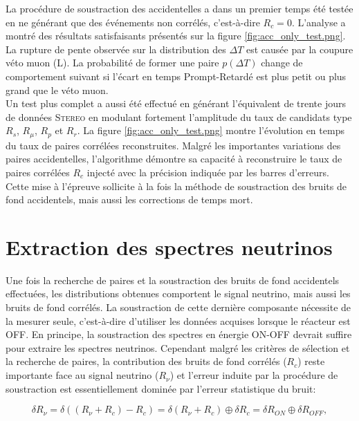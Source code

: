 La procédure de soustraction des accidentelles a dans un premier temps été testée en ne générant que des événements non corrélés, c'est-à-dire $R_c = 0$. L'analyse a montré des résultats satisfaisants présentés sur la figure \ref{fig:acc_only_test.png}. La rupture de pente observée sur la distribution des $\Delta T$ est causée par la coupure véto muon (L). La probabilité de former une paire $p(\Delta T)$ change de comportement suivant si l'écart en temps Prompt-Retardé est plus petit ou plus grand que le véto muon.\\

Un test plus complet a aussi été effectué en générant l'équivalent de trente jours de données \textsc{Stereo} en modulant fortement l'amplitude du taux de candidats type $R_s$, $R_\mu$, $R_p$ et $R_r$. La figure \ref{fig:acc_only_test.png} montre l'évolution en temps du taux de paires corrélées reconstruites. Malgré les importantes variations des paires accidentelles, l'algorithme démontre sa capacité à reconstruire le taux de paires corrélées $R_c$ injecté avec la précision indiquée par les barres d'erreurs. Cette mise à l'épreuve sollicite à la fois la méthode de soustraction des bruits de fond accidentels, mais aussi les corrections de temps mort.\\

\bigbreak

\section{Extraction des spectres neutrinos}

Une fois la recherche de paires et la soustraction des bruits de fond accidentels effectuées, les distributions obtenues comportent le signal neutrino, mais aussi les bruits de fond corrélés. La soustraction de cette dernière composante nécessite de la mesurer seule, c'est-à-dire d'utiliser les données acquises lorsque le réacteur est OFF. En principe, la soustraction des spectres en énergie ON-OFF devrait suffire pour extraire les spectres neutrinos. Cependant malgré les critères de sélection et la recherche de paires, la contribution des bruits de fond corrélés ($R_c$) reste importante face au signal neutrino ($R_\nu$) et l'erreur induite par la procédure de soustraction est essentiellement dominée par l'erreur statistique du bruit:

\begin{equation}
    \delta R_\nu = \delta ((R_\nu + R_c) - R_c) = \delta (R_\nu + R_c) \oplus \delta R_c = \delta R_{ON} \oplus \delta R_{OFF},
\end{equation}

